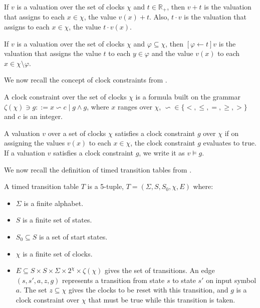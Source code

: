 If $v$ is a valuation over the set of clocks $\chi$ and $t \in \mathbb{R}_{+}$, then $v + t$ is the valuation that assigns to each $x \in \chi$, the value $v(x) + t$. Also, $t \cdot v$ is the valuation that assigns to each $x \in \chi$, the value $t \cdot v(x)$.

If $v$ is a valuation over the set of clocks $\chi$ and $\varphi \subseteq \chi$, then $[\varphi \leftarrow t]v$ is the valuation that assigns the value $t$ to each $y \in \varphi$ and the value $v(x)$ to each $x \in \chi \setminus \varphi$.

We now recall the concept of clock constraints from \cite{1,BBM-concur10,BBM-report}.

\begin{definition}
A clock constraint over the set of clocks $\chi$ is a formula built on the grammar $\zeta(\chi) \ni g ::= x \backsim c \; \vert \; g \wedge g$, where $x$ ranges over $\chi$, $\backsim \in \lbrace <, \leq, =, \geq, > \rbrace$ and $c$ is an integer.
\end{definition}

A valuation $v$ over a set of clocks $\chi$ satisfies a clock constraint $g$ over $\chi$ if on assigning the values $v(x)$ to each $x \in \chi$, the clock constraint $g$ evaluates to true. If a valuation $v$ satisfies a clock constraint $g$, we write it as $v \models g$.

We now recall the definition of timed transition tables from \cite{1}.

\begin{definition}
A timed transition table $T$ is a 5-tuple, $T = (\Sigma, S, S_{0}, \chi, E)$ where:
\begin{itemize}
\item $\Sigma$ is a finite alphabet.
\item $S$ is a finite set of states.
\item $S_{0} \subseteq S$ is a set of start states.
\item $\chi$ is a finite set of clocks.
\item $E \subseteq S \times S \times \Sigma \times 2^{\chi} \times \zeta(\chi)$ gives the set of transitions. An edge $(s, s', a, z, g)$ represents a transition from state $s$ to state $s'$ on input symbol $a$. The set $z \subseteq \chi$ gives the clocks to be reset with this transition, and $g$ is a clock constraint over $\chi$ that must be true while this transition is taken.
\end{itemize}
\end{definition}

